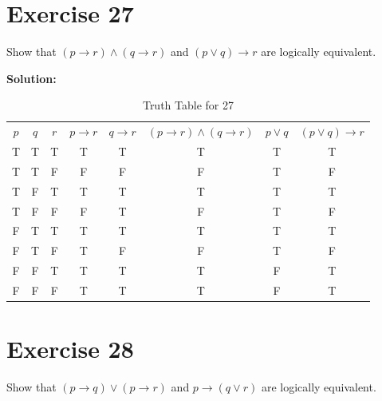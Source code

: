 \documentclass{Axon}
\begin{document}
\section*{Exercise 27}
Show that \((p \to r) \land (q \to r)\) and \((p \lor q) \to r\) are logically equivalent.

\noindent
\textbf{Solution:}
\begin{table}[ht]
    \centering
    \begin{tabular}{c|c|c|c|c|c|c|c}
        \(p\) & \(q\) & \(r\) & \(p \to r\) & \(q \to r\) & \((p \to r) \land (q \to r)\) & \(p \lor q\) & \((p \lor q) \to r\) \\
        T     & T     & T     & T           & T           & T                             & T            & T                    \\
        T     & T     & F     & F           & F           & F                             & T            & F                    \\
        T     & F     & T     & T           & T           & T                             & T            & T                    \\
        T     & F     & F     & F           & T           & F                             & T            & F                    \\
        F     & T     & T     & T           & T           & T                             & T            & T                    \\
        F     & T     & F     & T           & F           & F                             & T            & F                    \\
        F     & F     & T     & T           & T           & T                             & F            & T                    \\
        F     & F     & F     & T           & T           & T                             & F            & T
    \end{tabular}
    \caption{Truth Table for 27}
\end{table}

\section*{Exercise 28}
Show that \((p \to q) \lor (p \to r)\) and \(p \to (q \lor r)\) are logically equivalent.
\end{document}
